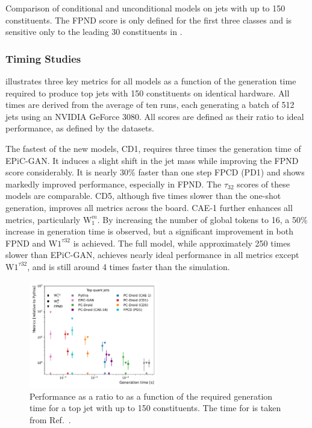 \begin{table}[tp]
    \centering
    \renewcommand{\arraystretch}{1.5}
    \caption{Comparison of conditional and unconditional models on jets with up to 150 constituents. The FPND score is only defined for the first three classes and is sensitive only to the leading 30 constituents in \pt.
    }
    \label{tab:perf-150-unconditional}
    \resizebox{\textwidth}{!}{%
        
    }
\end{table}

\FloatBarrier

\subsubsection{Timing Studies}

 illustrates three key metrics for all models as a function of the generation time required to produce top jets with 150 constituents on identical hardware.
All times are derived from the average of ten runs, each generating a batch of 512 jets using an NVIDIA GeForce 3080.
All scores are defined as their ratio to ideal performance, as defined by the \pythia datasets.

The fastest of the new models, CD1, requires three times the generation time of EPiC-GAN.
It induces a slight shift in the jet mass while improving the FPND score considerably.
It is nearly 30\% faster than one step FPCD (PD1) and shows markedly improved performance, especially in FPND.
The $\tau_{32}$ scores of these models are comparable.
CD5, although five times slower than the one-shot generation, improves all metrics across the board.
CAE-1 further enhances all metrics, particularly $\mathrm{W}_1^m$.
By increasing the number of global tokens to 16, a 50\% increase in generation time is observed, but a significant improvement in both FPND and $\mathrm{W}1^{\tau{32}}$ is achieved.
The full \pcdroid model, while approximately 250 times slower than EPiC-GAN, achieves nearly ideal performance in all metrics except $\mathrm{W}1^{\tau{32}}$, and is still around 4 times faster than the \pythia simulation.

\begin{figure}[htbp]
    \centering
    \includegraphics[width=0.5\textwidth]{Figures/jet_generation/droid/150/metrics_vs_times/t/t_metrics_vs_times.pdf}
    \caption{Performance as a ratio to \pythia as a function of the required generation time for a top jet with up to 150 constituents. The time for \pythia is taken from Ref.~\cite{MPGAN}.}
    \label{fig:timing}
\end{figure}

